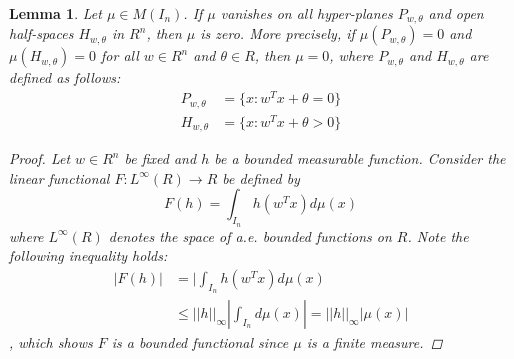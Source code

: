 \documentclass[12pt]{amsart}
\theoremstyle{plain}
\newtheorem{lemma}[thm]{Lemma}
\theoremstyle{definition}
\theoremstyle{remark}
\numberwithin{equation}{section}
\numberwithin{thm}{section}
\begin{document}
\begin{lemma}\label{lemma:Calin223}
Let $\mu \in M(I_n)$. If $\mu$ vanishes on all hyper-planes $P_{w,\theta}$ and open half-spaces $H_{w,\theta}$ in $R^n$, then $\mu$ is zero. More precisely, if $\mu(P_{w,\theta})=0$ and $\mu(H_{w,\theta})=0$ for all $w \in R^n$ and $\theta \in R$, then $\mu=0$, where $P_{w,\theta}$ and $H_{w,\theta}$ are defined as follows: 
\begin{equation*}
    \begin{aligned}
        P_{w,\theta} & = \{ x : w^Tx+\theta =0 \} \\
        H_{w,\theta} & = \{ x : w^Tx+\theta > 0 \}
    \end{aligned}
\end{equation*}
\begin{proof}
Let $w \in R^n$ be fixed and $h$ be a bounded measurable function. Consider the linear functional $F: L^\infty (R) \to R$ be defined by
\begin{equation*}
    F(h) = \int_{I_n} h(w^Tx)d\mu(x)
\end{equation*}
where $L^\infty(R)$ denotes the space of a.e. bounded functions on $R$. 
Note the following inequality holds:
\begin{equation*}
    \begin{aligned}
        |F(h)| &= |\int_{I_n} h(w^Tx)d\mu(x) \\
        & \leq ||h||_\infty |\int_{I_n}d\mu(x)| = ||h||_\infty  |\mu(x)|        
    \end{aligned}
\end{equation*}
, which shows $F$ is a bounded functional since $\mu$ is a finite measure. 


\end{proof}
\end{lemma}
\end{document}
